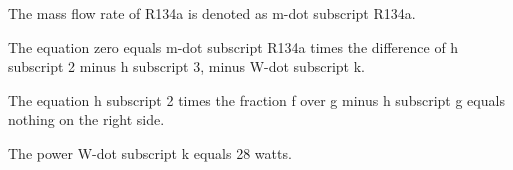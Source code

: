 The mass flow rate of R134a is denoted as m-dot subscript R134a.

The equation zero equals m-dot subscript R134a times the difference of h subscript 2 minus h subscript 3, minus W-dot subscript k.

The equation h subscript 2 times the fraction f over g minus h subscript g equals nothing on the right side.

The power W-dot subscript k equals 28 watts.